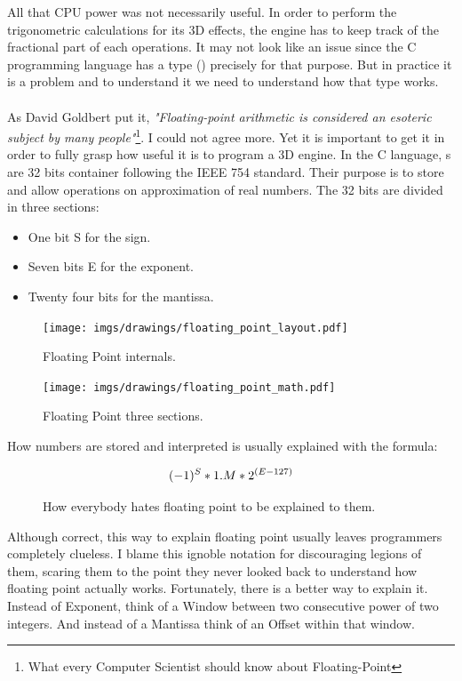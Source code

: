 \documentclass[book.tex]{subfiles}
\begin{document}
   All that CPU power was not necessarily useful. In order to perform the trigonometric calculations for its 3D effects, the engine has to keep track of the fractional part of each operations. It may not look like an issue since the C programming language has a type () precisely for that purpose. But in practice it is a problem and to understand it we need to understand how that type works.\\
\\
 As David Goldbert put it, \emph{"Floating-point arithmetic is considered an esoteric subject by many people"}\footnote{What every Computer Scientist should know about Floating-Point}. I could not agree more. Yet it is important to get it in order to fully grasp how useful it is to program a 3D engine. In the C language, s are 32 bits container following the IEEE 754 standard. Their purpose is to store and allow operations on approximation of real numbers. The 32 bits are divided in three sections:\\
\begin{itemize}
  \item One bit S for the sign.
  \item Seven bits E for the exponent.
  \item Twenty four bits for the mantissa.
\end{itemize} 

\begin{figure}[H]
\centering
\texttt{[image: imgs/drawings/floating\_point\_layout.pdf]}
\caption{Floating Point internals.}
\end{figure}
  \bigskip



\begin{figure}[H]
\centering
\texttt{[image: imgs/drawings/floating\_point\_math.pdf]}
\caption{Floating Point three sections.}
\end{figure}
  \bigskip  


How numbers are stored and interpreted is usually explained with the formula:\\
\par
\begin{figure}[H]
\begin{equation}\label{eq:fp}
\large
(-1)^S * 1.M * 2^{(E-127)}
\end{equation}
 \caption{How everybody hates floating point to be explained to them.}
\end{figure}
\bigskip  

Although correct, this way to explain floating point usually leaves programmers completely clueless. I blame this ignoble notation for discouraging legions of them, scaring them to the point they never looked back to understand how floating point actually works. Fortunately, there is a better way to explain it. Instead of Exponent, think of a Window between two consecutive power of two integers. And instead of a Mantissa think of an Offset within that window.\\ 
\par
  
\end{document}
